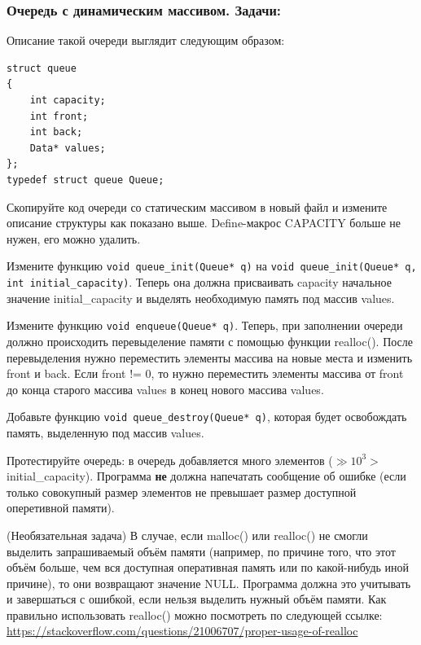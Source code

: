 \documentclass{article}
\newenvironment{modenumerate}
  {\enumerate\setupmodenumerate}
  {\endenumerate}
\newif\ifmoditem
\newcommand{\setupmodenumerate}{%
  \global\moditemfalse
  \let\origmakelabel\makelabel
  \def\moditem##1{\global\moditemtrue\def\mesymbol{##1}\item}%
  \def\makelabel##1{%
    \origmakelabel{##1\ifmoditem\rlap{\mesymbol}\fi\enspace}%
    \global\moditemfalse}%
}
\begin{document}
\begin{modenumerate}
\subsubsection*{Очередь с динамическим массивом. Задачи:}

Описание такой очереди выглядит следующим образом:
\begin{verbatim}
struct queue
{
    int capacity;
    int front;
    int back;
    Data* values;
};
typedef struct queue Queue;
\end{verbatim}

\item Скопируйте код очереди со статическим массивом в новый файл и измените описание структуры как показано выше. Define-макрос CAPACITY больше не нужен, его можно удалить.

\item Измените функцию \texttt{void queue\_init(Queue* q)} на \texttt{void queue\_init(Queue* q, int initial\_capacity)}. Теперь она должна присваивать capacity начальное значение initial\_capacity и выделять необходимую память под массив values.

\item Измените функцию \texttt{void enqueue(Queue* q)}. Теперь, при заполнении очереди должно происходить перевыделение памяти с помощью функции realloc(). После перевыделения нужно переместить элементы массива на новые места и изменить front и back. Если front != 0, то нужно переместить элементы массива от front до конца старого массива values в конец нового массива values.

\item Добавьте функцию \texttt{void queue\_destroy(Queue* q)}, которая будет освобождать память, выделенную под массив values.

\item Протестируйте очередь: в очередь добавляется много элементов ($\gg 10^3 >$ initial\_capacity). Программа \textbf{не} должна напечатать сообщение об ошибке (если только совокупный размер элементов не превышает размер доступной оперетивной памяти). 

\moditem{*} (Необязательная задача) В случае, если malloc() или realloc() не смогли выделить запрашиваемый объём памяти (например, по причине того, что этот объём  больше, чем вся доступная оперативная память или по какой-нибудь иной причине), то они возвращают значение NULL. Программа должна это учитывать и завершаться с ошибкой, если нельзя выделить нужный объём памяти.
Как правильно использовать realloc() можно посмотреть по следующей ссылке:\\
\href{https://stackoverflow.com/questions/21006707/proper-usage-of-realloc}{https://stackoverflow.com/questions/21006707/proper-usage-of-realloc}
\end{modenumerate}
\end{document}
